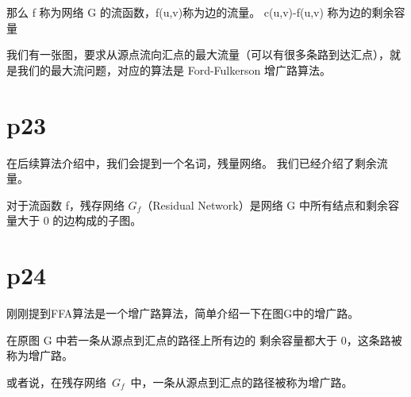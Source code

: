 \documentclass[onecolumn,oneside]{BUPTHomework}
\begin{document}
  那么 f 称为网络 G 的流函数，f(u,v)称为边的流量。
  c(u,v)-f(u,v) 称为边的剩余容量

  我们有一张图，要求从源点流向汇点的最大流量（可以有很多条路到达汇点），就是我们的最大流问题，对应的算法是 Ford-Fulkerson 增广路算法。

  \section*{p23}

  在后续算法介绍中，我们会提到一个名词，残量网络。
  我们已经介绍了剩余流量。

  对于流函数 f，残存网络 $G_f$（Residual Network）是网络 G 中所有结点和剩余容量大于 0 的边构成的子图。

  \section*{p24}

  刚刚提到FFA算法是一个增广路算法，简单介绍一下在图G中的增广路。

  在原图 G 中若一条从源点到汇点的路径上所有边的 剩余容量都大于 0，这条路被称为增广路。

  或者说，在残存网络 $G_f$ 中，一条从源点到汇点的路径被称为增广路。
  
\end{document}
